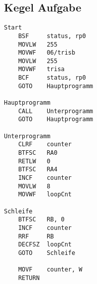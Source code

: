 \subsection*{Kegel Aufgabe}
\begin{lstlisting}[language=avr]
Start
    BSF     status, rp0
    MOVLW   255
    MOVWF   06/trisb
    MOVLW   255
    MOVWF   trisa
    BCF     status, rp0
    GOTO    Hauptprogramm

Hauptprogramm
    CALL    Unterprogramm
    GOTO    Hauptprogramm

Unterprogramm
    CLRF    counter
    BTFSC   RA0
    RETLW   0
    BTFSC   RA4
    INCF    counter
    MOVLW   8
    MOVWF   loopCnt

Schleife
    BTFSC   RB, 0
    INCF    counter
    RRF     RB
    DECFSZ  loopCnt
    GOTO    Schleife

    MOVF    counter, W
    RETURN
\end{lstlisting}